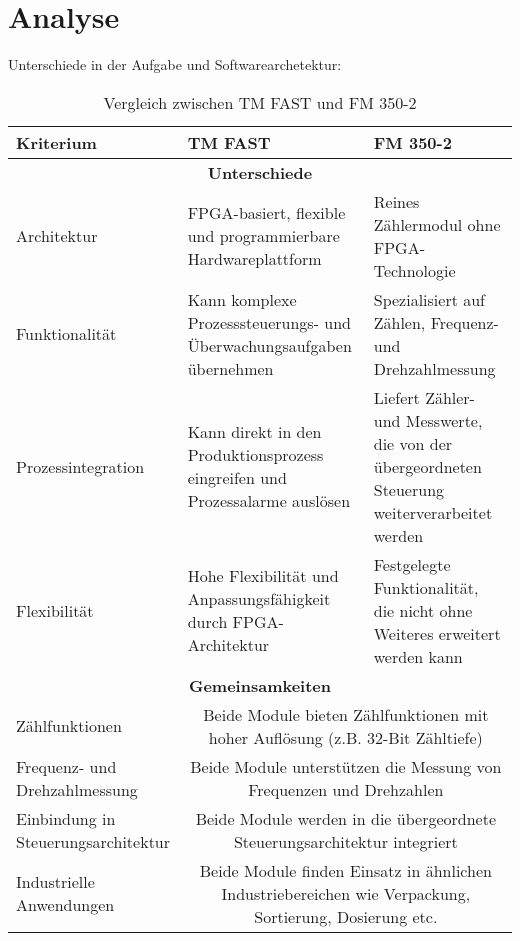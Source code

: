 \chapter{Analyse}

Unterschiede in der Aufgabe und Softwarearchetektur:

\begin{table}[h]
    \centering
    \renewcommand{\arraystretch}{1.3}
    \begin{tabularx}{\textwidth}{|X|X|X|}
        \hline
        \textbf{Kriterium} & \textbf{TM FAST} & \textbf{FM 350-2} \\
        \hline
        \multicolumn{3}{|c|}{\textbf{Unterschiede}} \\
        \hline
        Architektur & FPGA-basiert, flexible und programmierbare Hardwareplattform & Reines Zählermodul ohne FPGA-Technologie \\
        \hline
        Funktionalität & Kann komplexe Prozesssteuerungs- und Überwachungsaufgaben übernehmen & Spezialisiert auf Zählen, Frequenz- und Drehzahlmessung \\
        \hline
        Prozessintegration & Kann direkt in den Produktionsprozess eingreifen und Prozessalarme auslösen & Liefert Zähler- und Messwerte, die von der übergeordneten Steuerung weiterverarbeitet werden \\
        \hline
        Flexibilität & Hohe Flexibilität und Anpassungsfähigkeit durch FPGA-Architektur & Festgelegte Funktionalität, die nicht ohne Weiteres erweitert werden kann \\
        \hline
        \multicolumn{3}{|c|}{\textbf{Gemeinsamkeiten}} \\
        \hline
        Zählfunktionen & \multicolumn{2}{c|}{Beide Module bieten Zählfunktionen mit hoher Auflösung (z.B. 32-Bit Zähltiefe)} \\
        \hline
        Frequenz- und Drehzahlmessung & \multicolumn{2}{c|}{Beide Module unterstützen die Messung von Frequenzen und Drehzahlen} \\
        \hline
        Einbindung in Steuerungsarchitektur & \multicolumn{2}{c|}{Beide Module werden in die übergeordnete Steuerungsarchitektur integriert} \\
        \hline
        Industrielle Anwendungen & \multicolumn{2}{c|}{Beide Module finden Einsatz in ähnlichen Industriebereichen wie Verpackung, Sortierung, Dosierung etc.} \\
        \hline
    \end{tabularx}
    \caption{Vergleich zwischen TM FAST und FM 350-2}
    \label{tab:tm_fast_vs_fm350-2}
\end{table}

